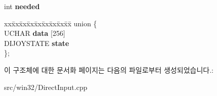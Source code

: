 \begin{DoxyCompactItemize}
\begin{tabbing}
\end{tabbing}\item 
\mbox{\label{structdevice_info_a3e85cef35fcad73f9f5fcd75a627ec80}} 
int {\bfseries needed}
\item 
\mbox{\label{structdevice_info_a44f2f54c2a9ac5917b0bb1dce46b15aa}} 
\begin{tabbing}
xx\=xx\=xx\=xx\=xx\=xx\=xx\=xx\=xx\=\kill
union \{\\
\>UCHAR {\bfseries data} \mbox{[}256\mbox{]}\\
\>DIJOYSTATE {\bfseries state}\\
\}; \\

\end{tabbing}\end{DoxyCompactItemize}


이 구조체에 대한 문서화 페이지는 다음의 파일로부터 생성되었습니다.\+:\begin{DoxyCompactItemize}
\item 
src/win32/Direct\+Input.\+cpp\end{DoxyCompactItemize}
